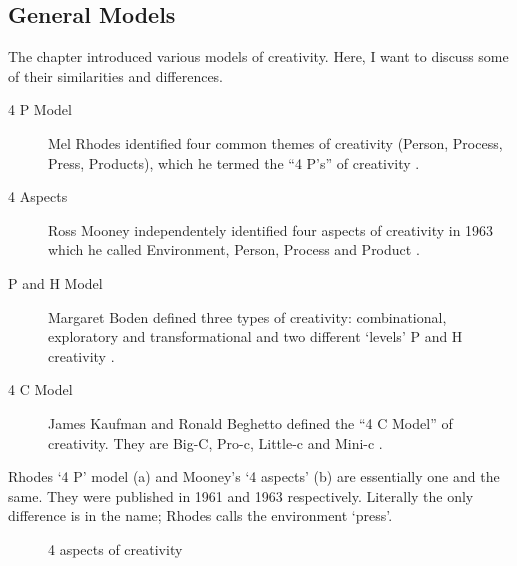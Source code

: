\subsection{General Models}

The  chapter introduced various models of creativity. Here, I want to discuss some of their similarities and differences.

\begin{description}
  \item [4 P Model] Mel Rhodes identified four common themes of creativity (Person, Process, Press, Products), which he termed the ``4 P's'' of creativity \autocite{Rhodes1961}.
  \item [4 Aspects] Ross Mooney independentely identified four aspects of creativity in 1963 which he called Environment, Person, Process and Product \autocite[as cited in][]{Sternberg1999}.
  \item [P and H Model] Margaret Boden defined three types of creativity: combinational, exploratory and transformational and two different `levels' P and H creativity \autocite{Boden2003}.
  \item [4 C Model] James Kaufman and Ronald Beghetto defined the ``4 C Model'' of creativity. They are Big-C, Pro-c, Little-c and Mini-c \autocite{Kaufman2009}.
\end{description}


Rhodes `4 P' model (a) and Mooney's `4 aspects' (b) are essentially one and the same. They were published in 1961 and 1963 respectively. Literally the only difference is in the name; Rhodes calls the environment `press'.

\begin{figure}[htb] %
  \centering
  \tikzset{every fit/.append style=text badly centered}
\caption[4 aspects of creativity]{4 aspects of creativity}
\label{fig:4Crea}
\end{figure}

